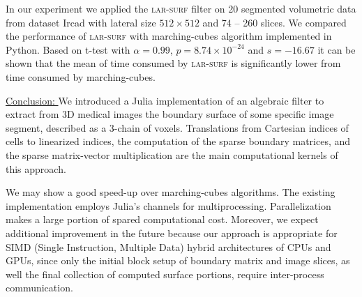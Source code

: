 \documentclass{article}
\begin{document}
In our experiment we applied the \textsc{lar-surf} filter on 20 segmented volumetric data from dataset Ircad \cite{ircad} with lateral size $512\times512$ and 74 -- 260 slices. We compared the performance of \textsc{lar-surf} with marching-cubes algorithm implemented in Python.
Based on t-test with $\alpha=0.99$, $p=8.74\times10^{-24}$ and 
$s=-16.67$ it can be shown that the mean of time consumed by \textsc{lar-surf} is significantly lower from time consumed by marching-cubes.


\vspace{10pt}
\noindent\underline{
Conclusion:
}\vspace{0.2em}\newline 
We introduced a Julia implementation of an algebraic filter to extract from 3D medical images the
boundary surface of some specific image segment, described as a 3-chain of voxels. Translations from
Cartesian indices of cells to linearized indices, the computation of the sparse boundary matrices, and the
sparse matrix-vector multiplication are the main computational kernels of this approach. 

We may show a good speed-up over marching-cubes algorithms. 
The existing implementation employs Julia's channels
for multiprocessing. 
Parallelization makes a large portion of spared computational cost. 
%
Moreover, we expect additional improvement in the future because our approach is appropriate  for SIMD (Single Instruction, Multiple Data) hybrid architectures of CPUs and GPUs, since only the initial block setup of boundary matrix and image slices, as well the final collection of computed surface portions, require inter-process communication. 





\end{document}
